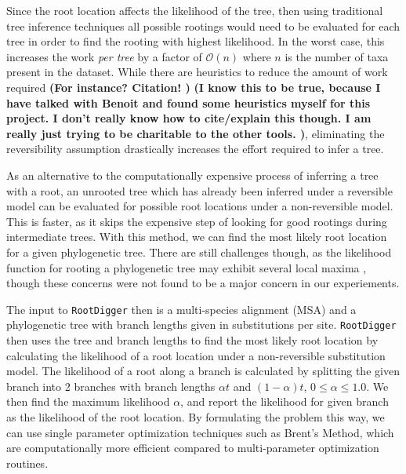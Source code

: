 \documentclass{article}
\newcommand{\RootDiggertt}{\texttt{RootDigger}}
\newcommand{\BenComment}[1]{{\bf \color{blue} ({#1})}}
\newcommand{\AlexisComment}[1]{{\bf \color{green} ({#1})}}
\begin{document}
Since the root location affects the likelihood of the tree, then using
traditional tree inference techniques all possible rootings would need to be
evaluated for each tree in order to find the rooting with highest likelihood.
In the worst case, this increases the work {\em per tree} by a factor of
$\mathcal{O}(n)$ where $n$ is the number of taxa present in the dataset.
While there are heuristics to reduce the amount of work required
\AlexisComment{For instance?
  Citation!
}\BenComment{I know this to be true, because I have talked with Benoit and
  found some heuristics myself for this project.
  I don't really know how to cite/explain this though.
  I am really just trying to be charitable to the other tools.
}, eliminating the reversibility assumption drastically increases the effort
required to infer a tree.

As an alternative to the computationally expensive process of inferring a tree
with a root, an unrooted tree which has already been inferred under a
reversible model can be evaluated for possible root locations under a
non-reversible model.
This is faster, as it skips the expensive step of looking for good rootings
during intermediate trees.
With this method, we can find the most likely root location for a given
phylogenetic tree.
There are still challenges though, as the likelihood function for rooting a
phylogenetic tree may exhibit several local maxima
\cite{huelsenbeck_inferring_2002}, though these concerns were not found to be a
major concern in our experiements.

The input to \RootDiggertt{} then is a multi-species alignment (MSA) and a
phylogenetic tree with branch lengths given in substitutions per site.
\RootDiggertt{} then uses the tree and branch lengths to find the most likely
root location by calculating the likelihood of a root location under a
non-reversible substitution model.
The likelihood of a root along a branch is calculated by splitting the given
branch into 2 branches with branch lengths $\alpha t$ and $(1-\alpha) t$, $0
  \leq \alpha \leq 1.0$.
We then find the maximum likelihood $\alpha$, and report the likelihood for
given branch as the likelihood of the root location.
By formulating the problem this way, we can use single parameter optimization
techniques such as Brent's Method\footnotemark{}, which are computationally
more efficient compared to multi-parameter optimization routines.

\end{document}
